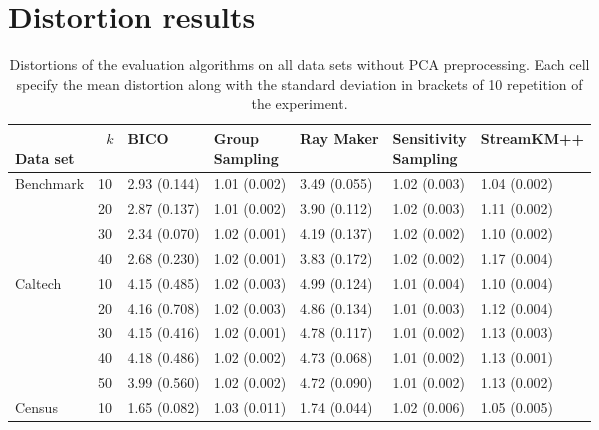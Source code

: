 \section{Distortion results}

\begin{table}[ht]
\centering
\caption{Distortions of the evaluation algorithms on all data sets without PCA preprocessing. Each cell specify the mean distortion along with the standard deviation in brackets of 10 repetition of the experiment.}
\label{tab:distortions-mean-std-without-pca}
\begin{tabular}{lllllll}
\toprule
\parbox[t]{2cm}{\ \\Data set}  & \parbox[t]{5mm}{\ \\$k$} &           BICO & \parbox[t]{1cm}{Group\\Sampling} &      Ray Maker & \parbox[t]{1cm}{Sensitivity\\Sampling} &    StreamKM++ \\
\midrule
Benchmark & 10  &   2.93 (0.144) &   1.01 (0.002) &   3.49 (0.055) &         1.02 (0.003) &  1.04 (0.002) \\
      & 20  &   2.87 (0.137) &   1.01 (0.002) &   3.90 (0.112) &         1.02 (0.003) &  1.11 (0.002) \\
      & 30  &   2.34 (0.070) &   1.02 (0.001) &   4.19 (0.137) &         1.02 (0.002) &  1.10 (0.002) \\
      & 40  &   2.68 (0.230) &   1.02 (0.001) &   3.83 (0.172) &         1.02 (0.002) &  1.17 (0.004) \\
\midrule
Caltech & 10  &   4.15 (0.485) &   1.02 (0.003) &   4.99 (0.124) &         1.01 (0.004) &  1.10 (0.004) \\
      & 20  &   4.16 (0.708) &   1.02 (0.003) &   4.86 (0.134) &         1.01 (0.003) &  1.12 (0.004) \\
      & 30  &   4.15 (0.416) &   1.02 (0.001) &   4.78 (0.117) &         1.01 (0.002) &  1.13 (0.003) \\
      & 40  &   4.18 (0.486) &   1.02 (0.002) &   4.73 (0.068) &         1.01 (0.002) &  1.13 (0.001) \\
      & 50  &   3.99 (0.560) &   1.02 (0.002) &   4.72 (0.090) &         1.01 (0.002) &  1.13 (0.002) \\
\midrule
Census & 10  &   1.65 (0.082) &   1.03 (0.011) &   1.74 (0.044) &         1.02 (0.006) &  1.05 (0.005) \\

\end{tabular}
\end{table}
